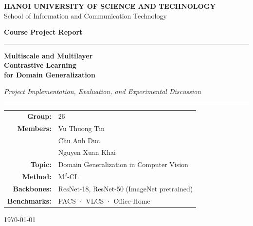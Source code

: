 \documentclass[11pt,a4paper]{article}
\newcommand{\method}{\texorpdfstring{$\mathrm{M}^2$\textup{-CL}}{M2-CL}}
\begin{document}

\begin{titlepage}
  \thispagestyle{empty}

  \noindent
  \colorbox{hustblue}{%
    \begin{minipage}{\textwidth}
      \vspace{8pt}
      \centering
      {\color{white}\large\bfseries
        HANOI UNIVERSITY OF SCIENCE AND TECHNOLOGY}\\[3pt]
      {\color{white!80!hustblue}\normalsize
        School of Information and Communication Technology}
      \vspace{8pt}
    \end{minipage}}

  \vspace{2.5cm}
  \begin{center}
    {\Huge\bfseries Course Project Report\par}
    \vspace{0.9cm}
    \textcolor{hustblue}{\rule{0.6\textwidth}{1.2pt}}
    \vspace{0.7cm}

    {\LARGE\bfseries
      Multiscale and Multilayer\\[4pt]
      Contrastive Learning\\[4pt]
      for Domain Generalization\par}
    \vspace{0.5cm}
    {\large\itshape
      Project Implementation, Evaluation, and Experimental Discussion\par}

    \vspace{1.2cm}
    \textcolor{hustblue}{\rule{0.6\textwidth}{0.6pt}}
    \vspace{1.0cm}

    \begin{tabular}{rl}
      \textbf{Group:}         & 26 \\[4pt]
      \textbf{Members:}       & Vu Thuong Tin \\
                              & Chu Anh Duc \\
                              & Nguyen Xuan Khai \\[4pt]
      \textbf{Topic:}         & Domain Generalization in Computer Vision \\[4pt]
      \textbf{Method:}        & \method{} \\[4pt]
      \textbf{Backbones:}     & ResNet-18, ResNet-50 (ImageNet pretrained) \\[4pt]
      \textbf{Benchmarks:}    & PACS · VLCS · Office-Home \\
    \end{tabular}

    \vfill
    {\large\today}
  \end{center}
\end{titlepage}
\end{document}
